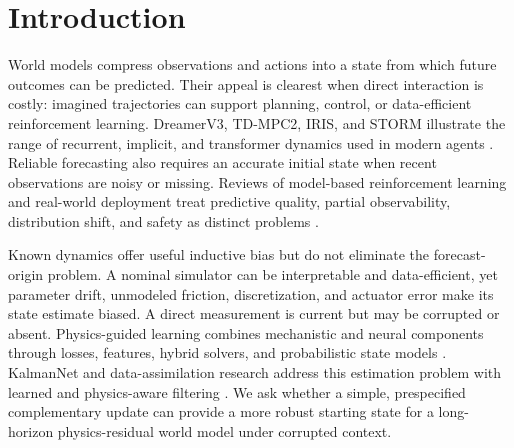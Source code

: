 \section{Introduction}

World models compress observations and actions into a state from which future
outcomes can be predicted. Their appeal is clearest when direct interaction is
costly: imagined trajectories can support planning, control, or data-efficient
reinforcement learning. DreamerV3, TD-MPC2, IRIS, and STORM illustrate the
range of recurrent, implicit, and transformer dynamics used in modern agents
\cite{hafner2025_mastering_diverse_control_tasks_through,hansen2023_td_mpc2_scalable_robust_world,micheli2022_transformers_are_sample_efficient_world,zhang2023_storm_efficient_stochastic_transformer_based}.
Reliable forecasting also requires an accurate initial state when recent
observations are noisy or missing.
Reviews of model-based reinforcement learning and real-world deployment treat
predictive quality, partial observability, distribution shift, and safety as
distinct problems
\cite{moerland2023_model_based_reinforcement_learning_a,dulac-arnold2021_challenges_of_real_world_reinforcement,brunke2022_safe_learning_in_robotics_from}.

Known dynamics offer useful inductive bias but do not eliminate the forecast-
origin problem. A nominal simulator can be interpretable and data-efficient,
yet parameter drift, unmodeled friction, discretization, and actuator error
make its state estimate biased. A direct measurement is current but may be
corrupted or absent. Physics-guided learning combines mechanistic and neural
components through losses, features, hybrid solvers, and probabilistic state
models
\cite{karniadakis2021_physics_informed_machine_learning,willard2022_integrating_scientific_knowledge_with_machine,yu2024_learning_dynamical_systems_from_data,shen2023_differentiable_modelling_to_unify_machine}.
KalmanNet and data-assimilation research address this estimation problem with
learned and physics-aware filtering
\cite{revach2022_kalmannet,cheng2023_machine_learning_with_data_assimilation}.
We ask whether a simple,
prespecified complementary update can provide a more robust starting state for
a long-horizon physics-residual world model under corrupted context.

